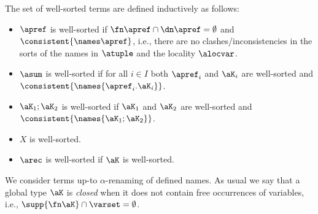 The set of well-sorted terms 
are defined inductively as follows:

\begin{itemize}
\item $\apref$ is well-sorted if $\fn\apref\cap\dn\apref = \emptyset$ and  
$\consistent{\names\apref}$, i.e., there are no clashes/inconsistencies in the sorts of 
the names in $\atuple$ and the locality $\alocvar$.

\item 
$\asum$ is well-sorted if for all ${i\in I}$ both ${\apref_i}$ and ${\aK_i}$ are
well-sorted and $\consistent{\names {\apref_i.\aK_i}}$.
 
\item 
$\aK_1;\aK_2$ is well-sorted if $\aK_1$ and $\aK_2$ are 
well-sorted and $\consistent{\names{\aK_1;\aK_2}}$.

\item $X$ is well-sorted.

\item $\arec$ is well-sorted if $\aK$ is well-sorted.

\end{itemize}


We consider terms up-to $\alpha$-renaming of defined names. As usual we 
say that a global type $\aK$ is {\em closed} when it does not contain free occurrences of 
variables, i.e., $\supp{\fn\aK} \cap \varset = \emptyset$. 


